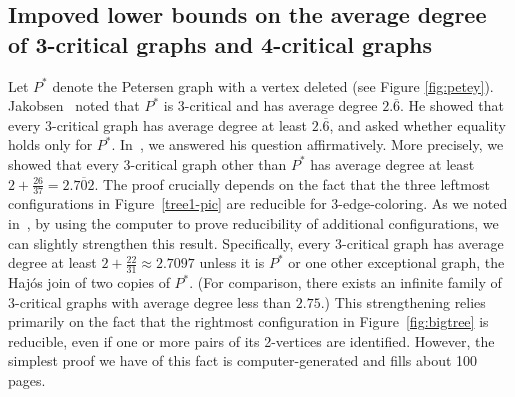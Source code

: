 \documentclass[12pt]{article}
\theoremstyle{plain}
\theoremstyle{definition}
\theoremstyle{remark}
\begin{document}
\subsection{Impoved lower bounds on the average degree of 3-critical graphs and
4-critical graphs}
Let $P^*$ denote the Petersen graph with a vertex deleted (see Figure \ref{fig:petey}).
Jakobsen~\cite{Jakobsen73,Jakobsen74} noted that $P^*$ is 3-critical and has
average degree $2.\overline{6}$.  He showed that every 3-critical graph has average
degree at least $2.\overline{6}$, and asked whether equality holds only for $P^*$.
In~\cite{3criticalCR}, we answered his question affirmatively.  More precisely,
we showed that every 3-critical graph other than $P^*$ has average degree at
least $2+\frac{26}{37}=2.\overline{702}$.  The proof crucially depends on the
fact that the three leftmost configurations in Figure~\ref{tree1-pic} are
reducible for 3-edge-coloring.
As we noted in~\cite{3criticalCR}, by using the computer to prove reducibility
of additional configurations, we can slightly strengthen this result.  Specifically,
every 3-critical graph has average degree at least $2+\frac{22}{31} \approx
2.7097$ unless it is $P^*$ or one other exceptional graph, the Haj\'{o}s
join of two copies of $P^*$.  (For comparison, there exists an infinite family of
3-critical graphs with average degree less than $2.75$.)  This strengthening
relies primarily on the fact that the rightmost configuration in
Figure~\ref{fig:bigtree} is reducible, even if one or more pairs of
its 2-vertices are identified.  However, the simplest proof we have of this fact
is computer-generated and fills about 100 pages.
\end{document}
